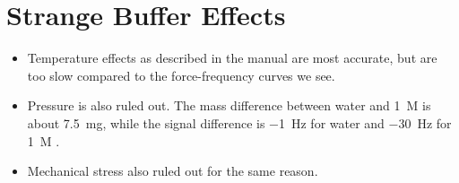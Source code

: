 \section{Strange Buffer Effects}

\begin{itemize}
\item Temperature effects as described in the manual are most accurate,
but are too slow compared to the force-frequency curves we see.
\item Pressure is also ruled out. The mass difference between water and
\SI{1}{M}  is about \SI{7.5}{\milli\gram}, while the signal
difference is \SI{-1}{\hertz} for water and \SI{-30}{\hertz} for
\SI{1}{M} .
\item Mechanical stress also ruled out for the same reason.
\end{itemize}
